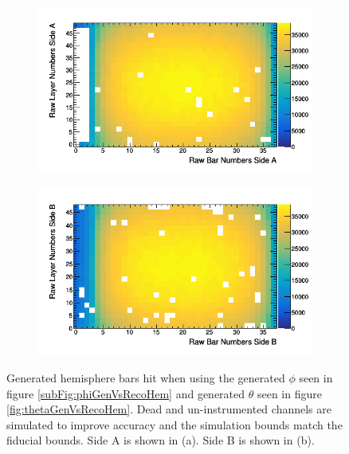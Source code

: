 \begin{figure}[!h]
\centering
\begin{subfigure}{.5\textwidth}
  \centering
  \includegraphics[width=\linewidth]{Chapter5/Figs/Raster/rawHemisphereFiducialBarsSideA.png}
  \captionsetup{width=.9\linewidth}
  \caption{}
  \label{subFig:rawHemisphereFiducialBarsSideA}
\end{subfigure}%
\begin{subfigure}{.5\textwidth}
  \centering
\includegraphics[width=\linewidth]{Chapter5/Figs/Raster/rawHemisphereFiducialBarsSideB.png}
  \captionsetup{width=.9\linewidth}
  \caption{}
  \label{subFig:rawHemisphereFiducialBarsSideB}
\end{subfigure}
\caption{Generated hemisphere bars hit when using the generated $\phi$ seen in figure \ref{subFig:phiGenVsRecoHem} and generated $\theta$ seen in figure \ref{fig:thetaGenVsRecoHem}. Dead and un-instrumented channels are simulated to improve accuracy and the simulation bounds match the fiducial bounds. Side A is shown in (a). Side B is shown in (b).}
\label{fig:rawHemisphereFiducialBarsSideAB}
\end{figure}

